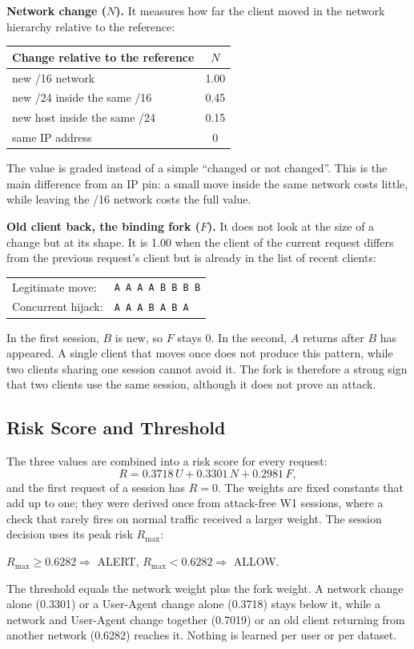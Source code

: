 \documentclass[conference]{IEEEtran}
\begin{document}
\textbf{Network change ($N$).} It measures how far the client moved in the
network hierarchy relative to the reference:
\begin{center}
\small
\begin{tabular}{@{}lc@{}}
\toprule
Change relative to the reference & $N$ \\
\midrule
new /16 network & 1.00 \\
new /24 inside the same /16 & 0.45 \\
new host inside the same /24 & 0.15 \\
same IP address & 0 \\
\bottomrule
\end{tabular}
\end{center}
The value is graded instead of a simple ``changed or not changed''. This is the
main difference from an IP pin: a small move inside the same network costs
little, while leaving the /16 network costs the full value.

\textbf{Old client back, the binding fork ($F$).} It does not look at the size
of a change but at its shape. It is 1.00 when the client of the current request
differs from the previous request's client but is already in the list of recent
clients:
\begin{center}
\begin{tabular}{@{}l@{\quad}l@{}}
Legitimate move: & \texttt{A A A A B B B B}\\
Concurrent hijack: & \texttt{A A A B A B A}
\end{tabular}
\end{center}
In the first session, $B$ is new, so $F$ stays 0. In the second, $A$ returns
after $B$ has appeared. A single client that moves once does not produce this
pattern, while two clients sharing one session cannot avoid it. The fork is
therefore a strong sign that two clients use the same session, although it does
not prove an attack.

\subsection{Risk Score and Threshold}

The three values are combined into a risk score for every request:
\begin{equation}
R = 0.3718\,U + 0.3301\,N + 0.2981\,F ,
\end{equation}
and the first request of a session has $R=0$. The weights are fixed constants
that add up to one; they were derived once from attack-free W1 sessions, where a
check that rarely fires on normal traffic received a larger weight. The session
decision uses its peak risk $R_{\max}$:
\begin{center}
$R_{\max}\ge 0.6282 \Rightarrow$ ALERT, \qquad $R_{\max}< 0.6282 \Rightarrow$ ALLOW.
\end{center}
The threshold equals the network weight plus the fork weight. A network change
alone (0.3301) or a User-Agent change alone (0.3718) stays below it, while a
network and User-Agent change together (0.7019) or an old client returning from
another network (0.6282) reaches it. Nothing is learned per user or per dataset.
\end{document}
